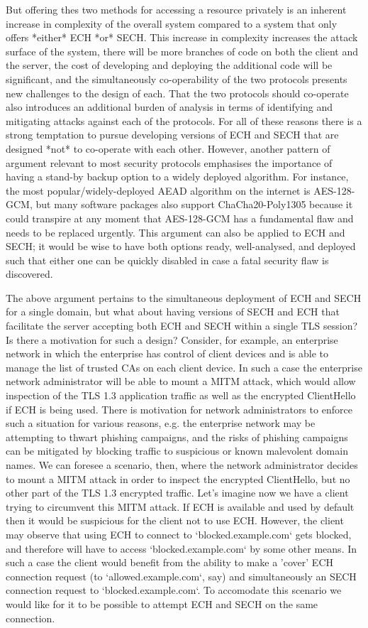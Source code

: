 But offering thes two methods for accessing a resource privately is an inherent increase in complexity of the overall system compared to a system that only offers *either* ECH *or* SECH. This increase in complexity increases the attack surface of the system, there will be more branches of code on both the client and the server, the cost of developing and deploying the additional code will be significant, and the simultaneously co-operability of the two protocols presents new challenges to the design of each. That the two protocols should co-operate also introduces an additional burden of analysis in terms of identifying and mitigating attacks against each of the protocols. For all of these reasons there is a strong temptation to pursue developing versions of ECH and SECH that are designed *not* to co-operate with each other. However, another pattern of argument relevant to most security protocols emphasises the importance of having a stand-by backup option to a widely deployed algorithm. For instance, the most popular/widely-deployed AEAD algorithm on the internet is AES-128-GCM, but many software packages also support ChaCha20-Poly1305 because it could transpire at any moment that AES-128-GCM has a fundamental flaw and needs to be replaced urgently. This argument can also be applied to ECH and SECH; it would be wise to have both options ready, well-analysed, and deployed such that either one can be quickly disabled in case a fatal security flaw is discovered.

The above argument pertains to the simultaneous deployment of ECH and SECH for a single domain, but what about having versions of SECH and ECH that facilitate the server accepting both ECH and SECH within a single TLS session? Is there a motivation for such a design? Consider, for example, an enterprise network in which the enterprise has control of client devices and is able to manage the list of trusted CAs on each client device. In such a case the enterprise network administrator will be able to mount a MITM attack, which would allow inspection of the TLS 1.3 application traffic as well as the encrypted ClientHello if ECH is being used. There is motivation for network administrators to enforce such a situation for various reasons, e.g. the enterprise network may be attempting to thwart phishing campaigns, and the risks of phishing campaigns can be mitigated by blocking traffic to suspicious or known malevolent domain names. We can foresee a scenario, then, where the network administrator decides to mount a MITM attack in order to inspect the encrypted ClientHello, but no other part of the TLS 1.3 encrypted traffic. Let's imagine now we have a client trying to circumvent this MITM attack. If ECH is available and used by default then it would be suspicious for the client not to use ECH. However, the client may observe that using ECH to connect to `blocked.example.com` gets blocked, and therefore will have to access `blocked.example.com` by some other means. In such a case the client would benefit from the ability to make a 'cover' ECH connection request (to `allowed.example.com`, say) and simultaneously an SECH connection request to `blocked.example.com`. To accomodate this scenario we would like for it to be possible to attempt ECH and SECH on the same connection.

